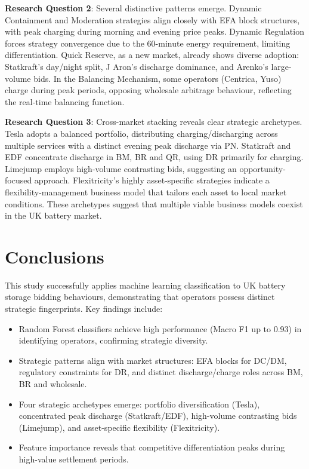 \documentclass[12pt,a4paper]{article}
\begin{document}
\textbf{Research Question 2}: Several distinctive patterns emerge. Dynamic Containment and Moderation strategies align closely with EFA block structures, with peak charging during morning and evening price peaks. Dynamic Regulation forces strategy convergence due to the 60-minute energy requirement, limiting differentiation. Quick Reserve, as a new market, already shows diverse adoption: Statkraft's day/night split, J Aron's discharge dominance, and Arenko's large-volume bids. In the Balancing Mechanism, some operators (Centrica, Yuso) charge during peak periods, opposing wholesale arbitrage behaviour, reflecting the real-time balancing function.

\textbf{Research Question 3}: Cross-market stacking reveals clear strategic archetypes. Tesla adopts a balanced portfolio, distributing charging/discharging across multiple services with a distinct evening peak discharge via PN. Statkraft and EDF concentrate discharge in BM, BR and QR, using DR primarily for charging. Limejump employs high-volume contrasting bids, suggesting an opportunity-focused approach. Flexitricity's highly asset-specific strategies indicate a flexibility-management business model that tailors each asset to local market conditions. These archetypes suggest that multiple viable business models coexist in the UK battery market.

\vspace{2cm}
\section{Conclusions}
This study successfully applies machine learning classification to UK battery storage bidding behaviours, demonstrating that operators possess distinct strategic fingerprints. Key findings include:
\begin{itemize}
    \item Random Forest classifiers achieve high performance (Macro F1 up to 0.93) in identifying operators, confirming strategic diversity.
    \item Strategic patterns align with market structures: EFA blocks for DC/DM, regulatory constraints for DR, and distinct discharge/charge roles across BM, BR and wholesale.
    \item Four strategic archetypes emerge: portfolio diversification (Tesla), concentrated peak discharge (Statkraft/EDF), high-volume contrasting bids (Limejump), and asset-specific flexibility (Flexitricity).
    \item Feature importance reveals that competitive differentiation peaks during high-value settlement periods.
\end{itemize}
\end{document}
